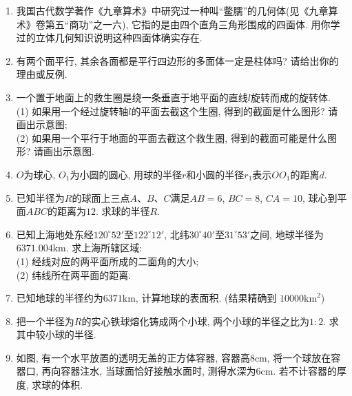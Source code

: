 \documentclass[10pt,a4paper]{article}
\begin{document}
\begin{enumerate}[1.]
\item 我国古代数学著作《九章算术》中研究过一种叫``鳖臑''的几何体(见《九章算术》卷第五``商功''之一六), 它指的是由四个直角三角形围成的四面体. 用你学过的立体几何知识说明这种四面体确实存在.
\item 有两个面平行, 其余各面都是平行四边形的多面体一定是柱体吗? 请给出你的理由或反例.
\item 一个置于地面上的救生圈是绕一条垂直于地平面的直线$l$旋转而成的旋转体.\\
(1) 如果用一个经过旋转轴$l$的平面去截这个生圈, 得到的截面是什么图形? 请画出示意图;\\
(2) 如果用一个平行于地面的平面去截这个救生圈, 得到的截面可能是什么图形? 请画出示意图.
\item $O$为球心, $O_1$为小圆的圆心, 用球的半径$r$和小圆的半径$r_1$表示$
OO_1$的距离$d$.
\item 已知半径为$R$的球面上三点$A$、$B$、$C$满足$AB=6$, $BC=8$, $CA=10$, 球心到平面$ABC$的距离为$12$. 求球的半径$R$.
\item 已知上海地处东经$120^\circ 52'$至$122^\circ 12'$, 北纬$30^\circ 40'$至$31^\circ 53'$之间, 地球半径为$6371.004\text{km}$. 求上海所辖区域:\\
(1) 经线对应的两平面所成的二面角的大小;\\
(2) 纬线所在两平面的距离.
\item 已知地球的半径约为$6371\text{km}$, 计算地球的表面积. (结果精确到
$10000\text{km}^2$)
\item 把一个半径为$R$的实心铁球熔化铸成两个小球, 两个小球的半径之比为$1:2$. 求其中较小球的半径.
\item 如图, 有一个水平放置的透明无盖的正方体容器, 容器高$8\text{cm}$, 将一个球放在容器口, 再向容器注水, 当球面恰好接触水面时, 测得水深为$
6\text{cm}$. 若不计容器的厚度, 求球的体积. 
\begin{center}
\end{center}
\end{enumerate}
\end{document}

